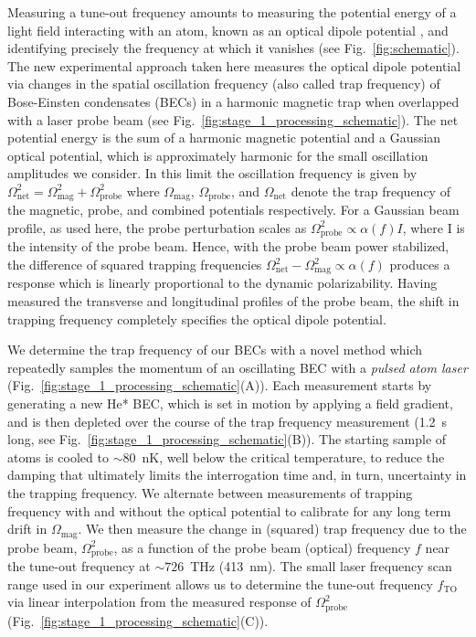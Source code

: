 \documentclass[aps,prl,
reprint,
superscriptaddress,
 amsmath,amssymb,
floatfix
]{revtex4-2}
\begin{document}
Measuring a tune-out frequency amounts to measuring the potential energy of a light field interacting with an atom, known as an optical dipole potential \cite{grimmOpticalDipoleTraps2000}, and identifying precisely the frequency at which it vanishes (see Fig.~\ref{fig:schematic}). The new experimental approach taken here measures the optical dipole potential via changes in the spatial oscillation frequency (also called trap frequency) of Bose-Einsten condensates (BECs) in a harmonic magnetic trap when overlapped with a laser probe beam (see Fig.~\ref{fig:stage_1_processing_schematic}). The net potential energy is the sum of a harmonic magnetic potential and a Gaussian optical potential, which is approximately harmonic for the small oscillation amplitudes we consider. In this limit the oscillation frequency is given by $\Omega_{\text{net}}^2=\Omega_{\text{mag}}^2+\Omega_{\text{probe}}^2$ where \(\Omega_{\text{mag}}\), \(\Omega_{\text{probe}}\), and \(\Omega_{\text{net}}\) denote the trap frequency of the magnetic, probe, and combined potentials respectively. For a Gaussian beam profile, as used here, the probe perturbation scales as \(\Omega_{\text{probe}}^2\propto \alpha(f) I\), where I is the intensity of the probe beam. Hence, with the probe beam power stabilized, the difference of squared trapping frequencies \(\Omega_{\text{net}}^2-\Omega_{\text{mag}}^2\propto\alpha(f)\) produces a response which is linearly proportional to the dynamic polarizability. Having measured the transverse and longitudinal profiles of the probe beam, the shift in trapping frequency completely specifies the optical dipole potential. 


We determine the trap frequency of our BECs with a novel method which repeatedly samples the momentum of an oscillating BEC with a \textit{pulsed atom laser} \cite{PhysRevLett.78.582,Manning:10} (Fig.~\ref{fig:stage_1_processing_schematic}(A)). Each measurement starts by generating a new He* BEC, which is set in motion by applying a field gradient, and is then depleted over the course of the trap frequency measurement (1.2~s long, see Fig.~\ref{fig:stage_1_processing_schematic}(B)). The starting sample of atoms is cooled to ${\sim}80$~nK, well below the critical temperature, to reduce the damping that ultimately limits the interrogation time and, in turn, uncertainty in the trapping frequency. We alternate between measurements of trapping frequency with and without the optical potential to calibrate for any long term drift in \(\Omega_{\text{mag}}\). We then measure the change in (squared) trap frequency due to the probe beam, \(\Omega_{\text{probe}}^2\), as a function of the probe beam (optical) frequency $f$ near the tune-out frequency at  ${\sim} 726$~THz (413~nm). The small laser frequency scan range used in our experiment allows us to determine the tune-out frequency \(f_{\text{TO}}\) via linear interpolation from the measured response of $\Omega_{\text{probe}}^2$ (Fig.~\ref{fig:stage_1_processing_schematic}(C)).
\end{document}
